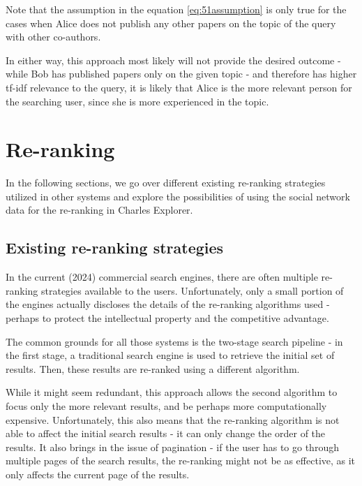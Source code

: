 Note that the assumption in the equation \ref{eq:51assumption} is only true for the cases when Alice does not publish any other papers on the topic of the query with other co-authors.


In either way, this approach most likely will not provide the desired outcome - while Bob has published papers only on the given topic - and therefore has higher tf-idf relevance to the query,
it is likely that Alice is the more relevant person for the searching user, since she is more experienced in the topic.

\section{Re-ranking}

In the following sections, we go over different existing re-ranking strategies utilized in other systems and explore the possibilities of using the social network data for the re-ranking in Charles Explorer.

\subsection{Existing re-ranking strategies}

In the current (2024) commercial search engines, there are often multiple re-ranking strategies available to the users.
Unfortunately, only a small portion of the engines actually discloses the details of the re-ranking algorithms used - perhaps to protect the intellectual property and the competitive advantage.

The common grounds for all those systems is the two-stage search pipeline - in the first stage, a traditional search engine is used to retrieve the initial set of results.
Then, these results are re-ranked using a different algorithm. 

While it might seem redundant, this approach allows the second algorithm to focus only the more relevant results, and be perhaps more computationally expensive.
Unfortunately, this also means that the re-ranking algorithm is not able to affect the initial search results - it can only change the order of the results.
It also brings in the issue of pagination - if the user has to go through multiple pages of the search results, the re-ranking might not be as effective,
as it only affects the current page of the results.

